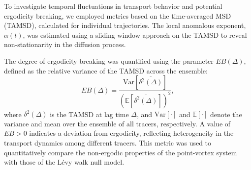 \documentclass[]{article}
\begin{document}
To investigate temporal fluctuations in transport behavior and potential ergodicity breaking, we employed metrics based on the time-averaged MSD (TAMSD), calculated for individual trajectories. The local anomalous exponent, $\alpha(t)$, was estimated using a sliding-window approach on the TAMSD to reveal non-stationarity in the diffusion process.

The degree of ergodicity breaking was quantified using the parameter $EB(\Delta)$, defined as the relative variance of the TAMSD across the ensemble:
\begin{equation}
EB(\Delta) = \frac{\text{Var}[\overline{\delta^2(\Delta)}]}{(\mathbb{E}[\overline{\delta^2(\Delta)}])^2},
\end{equation}
where $\overline{\delta^2(\Delta)}$ is the TAMSD at lag time $\Delta$, and $\text{Var}[\cdot]$ and $\mathbb{E}[\cdot]$ denote the variance and mean over the ensemble of all tracers, respectively. A value of $EB > 0$ indicates a deviation from ergodicity, reflecting heterogeneity in the transport dynamics among different tracers. This metric was used to quantitatively compare the non-ergodic properties of the point-vortex system with those of the L\'evy walk null model.
\end{document}
